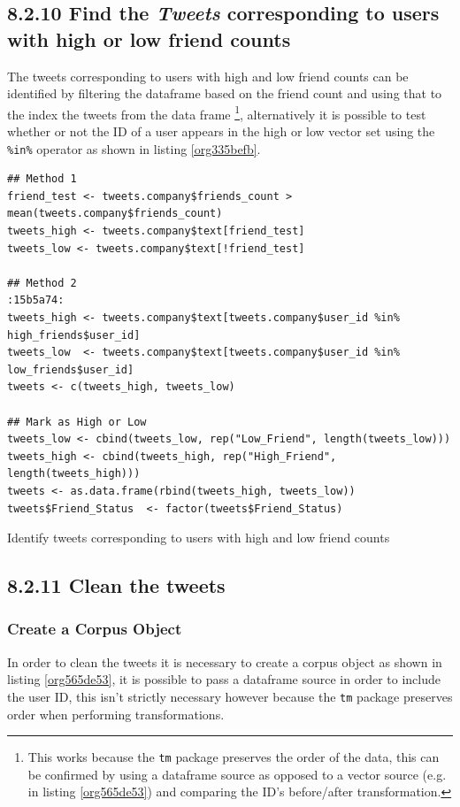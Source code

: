 \documentclass[11pt]{article}
\begin{document}
\subsection{8.2.10 Find the \emph{Tweets} corresponding to users with high or low friend counts}
\label{sec:orgc92e2c0}
The tweets corresponding to users with high and low friend counts can be
identified by filtering the dataframe based on the friend count and using that
to the index the tweets from the data frame \footnote{This works because the \texttt{tm} package preserves the order of the data, this can be confirmed by using a dataframe source as opposed to a vector source (e.g. in listing \ref{org565de53}) and comparing the ID's before/after transformation.}, alternatively it is possible
to test whether or not the ID of a user appears in the high or low vector
set using the \texttt{\%in\%} operator as shown in listing \ref{org335befb}.

\begin{listing}[htbp]
\begin{verbatim}
## Method 1
friend_test <- tweets.company$friends_count > mean(tweets.company$friends_count)
tweets_high <- tweets.company$text[friend_test]
tweets_low <- tweets.company$text[!friend_test]

## Method 2                                                                 :15b5a74:
tweets_high <- tweets.company$text[tweets.company$user_id %in%  high_friends$user_id]
tweets_low  <- tweets.company$text[tweets.company$user_id %in%  low_friends$user_id]
tweets <- c(tweets_high, tweets_low)

## Mark as High or Low
tweets_low <- cbind(tweets_low, rep("Low_Friend", length(tweets_low)))
tweets_high <- cbind(tweets_high, rep("High_Friend", length(tweets_high)))
tweets <- as.data.frame(rbind(tweets_high, tweets_low))
tweets$Friend_Status  <- factor(tweets$Friend_Status)
\end{verbatim}
\caption{\label{org335befb}Identify tweets corresponding to users with high and low friend counts}
\end{listing}

\subsection{8.2.11 Clean the tweets}
\label{sec:orge9bf351}
\subsubsection{Create a Corpus Object}
\label{sec:org4adc570}
In order to clean the tweets it is necessary to create a corpus object as shown in listing \ref{org565de53}, it is possible to pass a dataframe source in order to include the user ID, this isn't strictly necessary however because the \texttt{tm} package preserves order when performing transformations.
\end{document}

